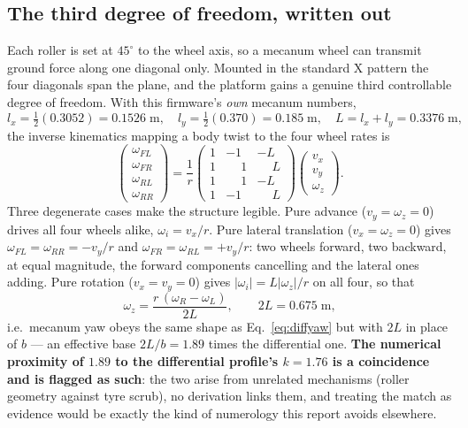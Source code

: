 \subsection{The third degree of freedom, written out}
\label{sec:wheelmecanum}
Each roller is set at $45^\circ$ to the wheel axis, so a mecanum wheel can
transmit ground force along one diagonal only. Mounted in the standard X
pattern the four diagonals span the plane, and the platform gains a genuine
third controllable degree of freedom. With this firmware's \emph{own}
mecanum numbers,
\begin{equation}
l_x = \tfrac{1}{2}(0.3052) = 0.1526\;\text{m},\quad
l_y = \tfrac{1}{2}(0.370) = 0.185\;\text{m},\quad
L = l_x + l_y = 0.3376\;\text{m},
\label{eq:mecgeom}
\end{equation}
the inverse kinematics mapping a body twist to the four wheel rates is
\begin{equation}
\begin{pmatrix}\omega_{FL}\\ \omega_{FR}\\ \omega_{RL}\\ \omega_{RR}\end{pmatrix}
=\frac{1}{r}
\begin{pmatrix}
 1 & -1 & -L\\
 1 & \phantom{-}1 & \phantom{-}L\\
 1 & \phantom{-}1 & -L\\
 1 & -1 & \phantom{-}L
\end{pmatrix}
\begin{pmatrix}v_x\\ v_y\\ \omega_z\end{pmatrix}.
\label{eq:mecik}
\end{equation}
Three degenerate cases make the structure legible. Pure advance
($v_y=\omega_z=0$) drives all four wheels alike, $\omega_i = v_x/r$. Pure
lateral translation ($v_x=\omega_z=0$) gives
$\omega_{FL}=\omega_{RR}=-v_y/r$ and $\omega_{FR}=\omega_{RL}=+v_y/r$: two
wheels forward, two backward, at equal magnitude, the forward components
cancelling and the lateral ones adding. Pure rotation ($v_x=v_y=0$) gives
$|\omega_i| = L|\omega_z|/r$ on all four, so that
\begin{equation}
\omega_z = \frac{r\,(\omega_R-\omega_L)}{2L},
\qquad 2L = 0.675\;\text{m},
\label{eq:mecyaw}
\end{equation}
i.e.\ mecanum yaw obeys the same shape as Eq.~\ref{eq:diffyaw} but with
$2L$ in place of $b$ --- an effective base $2L/b = 1.89$ times the
differential one. \textbf{The numerical proximity of $1.89$ to the
differential profile's $k=1.76$ is a coincidence and is flagged as such}:
the two arise from unrelated mechanisms (roller geometry against tyre
scrub), no derivation links them, and treating the match as evidence would
be exactly the kind of numerology this report avoids elsewhere.

